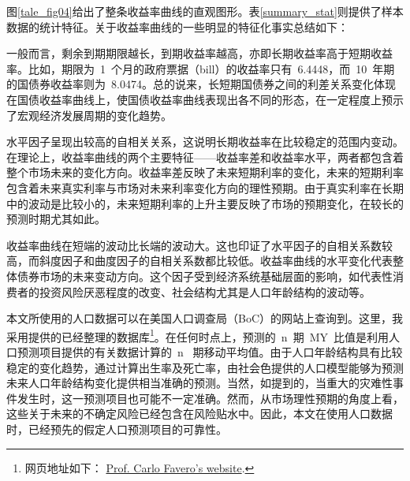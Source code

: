 图\eqref{tale_fig04}给出了整条收益率曲线的直观图形。表\eqref{summary_stat}则提供了样本数据的统计特征。关于收益率曲线的一些明显的特征化事实总结如下：
\begin{compactenum}[(i)]
  \item 一般而言，剩余到期期限越长，到期收益率越高，亦即长期收益率高于短期收益率。比如，期限为~1~个月的政府票据（bill）的收益率只有~6.4448，而~10~年期的国债券收益率则为~8.0474。总的说来，长短期国债券之间的利差关系变化体现在国债收益率曲线上，使国债收益率曲线表现出各不同的形态，在一定程度上预示了宏观经济发展周期的变化趋势。
  \item 水平因子呈现出较高的自相关关系，这说明长期收益率在比较稳定的范围内变动。在理论上，收益率曲线的两个主要特征——收益率差和收益率水平，两者都包含着整个市场未来的变化方向。收益率差反映了未来短期利率的变化，未来的短期利率包含着未来真实利率与市场对未来利率变化方向的理性预期。由于真实利率在长期中的波动是比较小的，未来短期利率的上升主要反映了市场的预期变化，在较长的预测时期尤其如此。
  \item 收益率曲线在短端的波动比长端的波动大。这也印证了水平因子的自相关系数较高，而斜度因子和曲度因子的自相关系数都比较低。收益率曲线的水平变化代表整体债券市场的未来变动方向。这个因子受到经济系统基础层面的影响，如代表性消费者的投资风险厌恶程度的改变、社会结构尤其是人口年龄结构的波动等。
\end{compactenum}

本文所使用的人口数据可以在美国人口调查局（BoC）的网站上查询到。这里，我采用提供的已经整理的数据库\footnote{网页地址如下： \href{http://didattica.unibocconi.eu/myigier/index.php?IdUte=48917&idr=1753&lingua=eng}%
   {Prof. Carlo Favero's website}.}。在任何时点上，预测的~n~期~MY~比值是利用人口预测项目提供的有关数据计算的~n~ 期移动平均值。由于人口年龄结构具有比较稳定的变化趋势，通过计算出生率及死亡率，由社会色提供的人口模型能够为预测未来人口年龄结构变化提供相当准确的预测。当然，如提到的，当重大的灾难性事件发生时，这一预测项目也可能不一定准确。然而，从市场理性预期的角度上看，这些关于未来的不确定风险已经包含在风险贴水中。因此，本文在使用人口数据时，已经预先的假定人口预测项目的可靠性。
   
